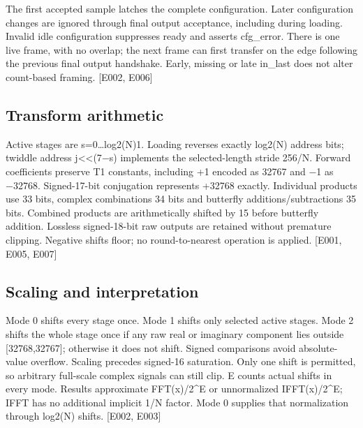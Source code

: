 \documentclass[11pt,a4paper]{article}
\begin{document}
The first accepted sample latches the complete configuration. Later configuration changes are ignored through final output acceptance,\allowbreak{} including during loading. Invalid idle configuration suppresses ready and asserts cfg\_\allowbreak{}error. There is one live frame,\allowbreak{} with no overlap; the next frame can first transfer on the edge following the previous final output handshake. Early,\allowbreak{} missing or late in\_\allowbreak{}last does not alter count-based framing. [\allowbreak{}E002,\allowbreak{} E006]\allowbreak{}

\subsection{Transform arithmetic}

Active stages are s=\allowbreak{}0…log2(\allowbreak{}N)1. Loading reverses exactly log2(\allowbreak{}N)\allowbreak{} address bits; twiddle address j<<(\allowbreak{}7{\vulcanmathsymbols −}s)\allowbreak{} implements the selected-length stride 256/\allowbreak{}N. Forward coefficients preserve T1 constants,\allowbreak{} including +\allowbreak{}1 encoded as 32767 and {\vulcanmathsymbols −}1 as {\vulcanmathsymbols −}32768. Signed-17-bit conjugation represents +\allowbreak{}32768 exactly. Individual products use 33 bits,\allowbreak{} complex combinations 34 bits and butterfly additions/\allowbreak{}subtractions 35 bits. Combined products are arithmetically shifted by 15 before butterfly addition. Lossless signed-18-bit raw outputs are retained without premature clipping. Negative shifts floor; no round-to-nearest operation is applied. [\allowbreak{}E001,\allowbreak{} E005,\allowbreak{} E007]\allowbreak{}

\subsection{Scaling and interpretation}

Mode 0 shifts every stage once. Mode 1 shifts only selected active stages. Mode 2 shifts the whole stage once if any raw real or imaginary component lies outside [32768,\allowbreak{}32767]\allowbreak{}; otherwise it does not shift. Signed comparisons avoid absolute-value overflow. Scaling precedes signed-16 saturation. Only one shift is permitted,\allowbreak{} so arbitrary full-scale complex signals can still clip. E counts actual shifts in every mode. Results approximate FFT(\allowbreak{}x)\allowbreak{}/\allowbreak{}2\textasciicircum{}E or unnormalized IFFT(\allowbreak{}x)\allowbreak{}/\allowbreak{}2\textasciicircum{}E; IFFT has no additional implicit 1/\allowbreak{}N factor. Mode 0 supplies that normalization through log2(\allowbreak{}N)\allowbreak{} shifts. [\allowbreak{}E002,\allowbreak{} E003]\allowbreak{}
\end{document}

